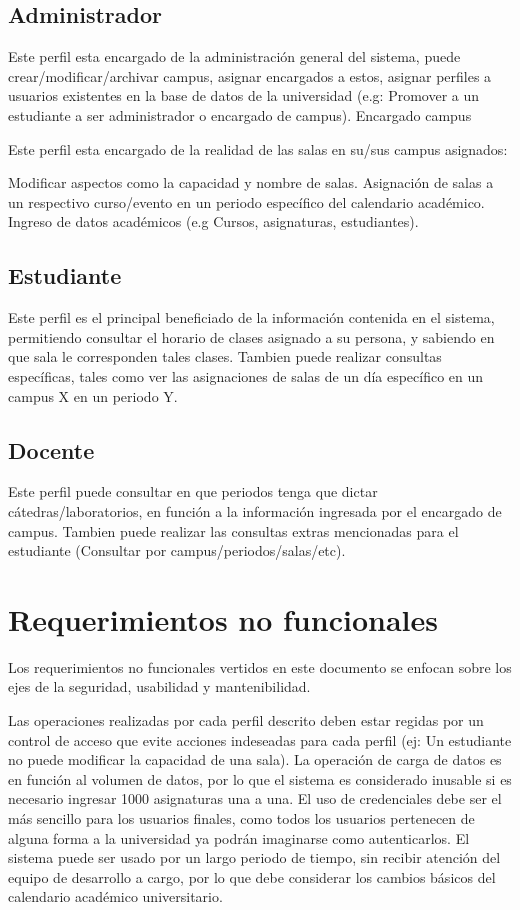 \documentclass[a4paper,10pt]{article}
\begin{document}
\subsection{Administrador}

Este perfil esta encargado de la administración general del sistema, puede crear/modificar/archivar campus, asignar encargados a estos, asignar perfiles a usuarios existentes en la base de datos de la universidad (e.g: Promover a un estudiante a ser administrador o encargado de campus).
Encargado campus

Este perfil esta encargado de la realidad de las salas en su/sus campus asignados:

    Modificar aspectos como la capacidad y nombre de salas.
    Asignación de salas a un respectivo curso/evento en un periodo específico del calendario académico.
    Ingreso de datos académicos (e.g Cursos, asignaturas, estudiantes).

\subsection{Estudiante}

Este perfil es el principal beneficiado de la información contenida en el sistema, permitiendo consultar el horario de clases asignado a su persona, y sabiendo en que sala le corresponden tales clases. Tambien puede realizar consultas específicas, tales como ver las asignaciones de salas de un día específico en un campus X en un periodo Y.

\subsection{Docente}

Este perfil puede consultar en que periodos tenga que dictar cátedras/laboratorios, en función a la información ingresada por el encargado de campus. Tambien puede realizar las consultas extras mencionadas para el estudiante (Consultar por campus/periodos/salas/etc).

\section{Requerimientos no funcionales}

Los requerimientos no funcionales vertidos en este documento se enfocan sobre los ejes de la seguridad, usabilidad y mantenibilidad.

    Las operaciones realizadas por cada perfil descrito deben estar regidas por un control de acceso que evite acciones indeseadas para cada perfil (ej: Un estudiante no puede modificar la capacidad de una sala).
    La operación de carga de datos es en función al volumen de datos, por lo que el sistema es considerado inusable si es necesario ingresar 1000 asignaturas una a una.
    El uso de credenciales debe ser el más sencillo para los usuarios finales, como todos los usuarios pertenecen de alguna forma a la universidad ya podrán imaginarse como autenticarlos.
    El sistema puede ser usado por un largo periodo de tiempo, sin recibir atención del equipo de desarrollo a cargo, por lo que debe considerar los cambios básicos del calendario académico universitario.
\end{document}
